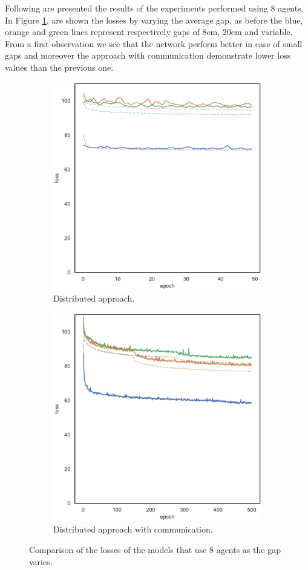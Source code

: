 Following are presented the results of the experiments performed using 
$8$ agents. In Figure \ref{fig:commlossN8}, are shown the losses by varying the 
average gap, as before the blue, orange and green lines represent respectively 
gaps of $8$\gls{cm}, $20$\gls{cm} and variable. From a first observation we see 
that the network perform better in case of small gaps and moreover the approach 
with communication demonstrate lower loss values than the previous one.
\begin{figure}[!htb]
	\begin{center}
		\begin{subfigure}[h]{0.49\textwidth}
			\centering
			\includegraphics[width=.7\textwidth]{contents/images/task1-comm-extension/loss-distributed-N8@copy}
			\caption{Distributed approach.}
		\end{subfigure}
		\hfill
		\begin{subfigure}[h]{0.49\textwidth}
			\centering
			\includegraphics[width=.7\textwidth]{contents/images/task1-comm-extension/loss-communication-N8@copy}
			\caption{Distributed approach with communication.}
		\end{subfigure}	
	\end{center}
	\vspace{-0.5cm}
	\caption{Comparison of the losses of the models that use $8$ agents as the gap 
		varies.}
	\label{fig:commlossN8}
\end{figure}

